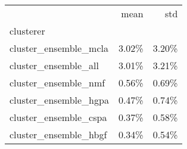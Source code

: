 \begin{tabular}{lrr}
\toprule
{} &  mean &   std \\
clusterer             &       &       \\
\midrule
cluster\_ensemble\_mcla & 3.02\% & 3.20\% \\
cluster\_ensemble\_all  & 3.01\% & 3.21\% \\
cluster\_ensemble\_nmf  & 0.56\% & 0.69\% \\
cluster\_ensemble\_hgpa & 0.47\% & 0.74\% \\
cluster\_ensemble\_cspa & 0.37\% & 0.58\% \\
cluster\_ensemble\_hbgf & 0.34\% & 0.54\% \\
\bottomrule
\end{tabular}

